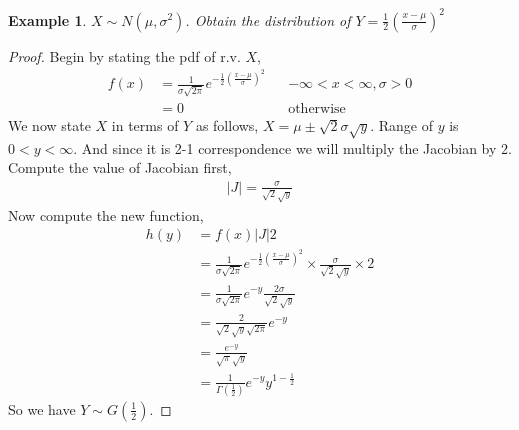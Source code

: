 \documentclass[oneside,11pt,pdftex]{book}%
\numberwithin{equation}{section}
\newtheorem{example}[theorem]{Example}
\numberwithin{section}{chapter}
\numberwithin{equation}{chapter}
\begin{document}
\begin{example}
	$ X \sim N(\mu, \sigma^2) $. Obtain the distribution of $ Y=\frac{1}{2} \left( \frac{x-\mu }{\sigma}\right)^2$
\end{example}
\begin{proof}
	Begin by stating the pdf of r.v. $ X 
	$,
	\begin{align*}
		f(x)&={\displaystyle {\frac {1}{\sigma {\sqrt {2\pi }}}}e^{-{\frac {1}{2}}\left({\frac {x-\mu }{\sigma }}\right)^{2}}} && -\infty<x<\infty, \sigma>0\\
		&=0 && \text{otherwise}
	\end{align*}
	We now state $ X $ in terms of $ Y $ as follows, $ X= \mu \pm \sqrt{2} \sigma \sqrt{y}  $. Range of $ y $ is $ 0<y<\infty $. And since it is 2-1 correspondence we will multiply the Jacobian by $ 2 $.\\
	Compute the value of Jacobian first,
	\begin{align*}
		|J|=\frac{\sigma }{\sqrt{2} \sqrt{y}}
	\end{align*}
	Now compute the new function,
	\begin{align*}
		h(y)&=f(x)|J|2\\
		&={\displaystyle {\frac {1}{\sigma {\sqrt {2\pi }}}}e^{-{\frac {1}{2}}\left({\frac {x-\mu }{\sigma }}\right)^{2}}} \times \frac{\sigma }{\sqrt{2} \sqrt{y}} \times 2\\
		&=\frac{1}{\sigma \sqrt{2\pi}}e^{-y} \frac{2 \sigma}{\sqrt{2}\sqrt{y}}\\
		&= \frac{2}{\sqrt{2}\sqrt{y} \sqrt{2 \pi}}e^{-y}\\
		&= \frac{e^{-y}}{\sqrt{\pi}\sqrt{y}}\\
		&=\frac{1}{\Gamma(\frac{1}{2})}e^{-y}y^{1-\frac{1}{2}}
	\end{align*}
	So we have $ Y \sim G\left(\frac{1}{2} \right) $.
\end{proof}
\end{document}
